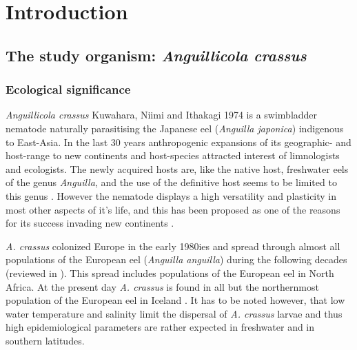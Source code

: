 

\chapter{Introduction}
\label{chap:intro}
\ifpdf
    \graphicspath{{1_introduction/figures/PNG/}{1_introduction/figures/PDF/}{1_introduction/figures/}}
\else
    \graphicspath{{1_introduction/figures/EPS/}{1_introduction/figures/}}
\fi


\section{The study organism: \textit{Anguillicola crassus}} 
\label{stud-org}

\subsection{Ecological significance} 
\label{eco-sig}

\textit{Anguillicola crassus} Kuwahara, Niimi and Ithakagi 1974
\cite{kuwahara_Niimi_Itagaki_1974} is a swimbladder nematode naturally
parasitising the Japanese eel (\textit{Anguilla japonica}) indigenous
to East-Asia. In the last 30 years anthropogenic expansions of its
geographic- and host-range to new continents and host-species
attracted interest of limnologists and ecologists. The newly acquired
hosts are, like the native host, freshwater eels of the genus
\textit{Anguilla}, and the use of the definitive host seems to be
limited to this genus \cite{sures_development_1999}. However the
nematode displays a high versatility and plasticity in most other
aspects of it's life, and this has been proposed as one of the reasons
for its success invading new continents
\cite{taraschewski_hosts_2007}.

\textit{A. crassus} colonized Europe in the early 1980ies and spread
through almost all populations of the European eel (\textit{Anguilla
  anguilla}) during the following decades (reviewed in
\cite{kirk_impact_2003}). This spread includes populations of the
European eel in North
Africa\cite{gargouri_ben_abdallah_spatio-temporal_2006,
  loukili_dynamics_2007}. At the present day \textit{A. crassus} is
found in all but the northernmost population of the European eel in
Iceland \cite{kristmundsson_parasite_2007}. It has to be noted
however, that low water temperature \cite{knopf_impact_1998} and
salinity \cite{kirk_effect_2000} limit the dispersal of
\textit{A. crassus} larvae and thus high epidemiological parameters are
rather expected in freshwater and in southern latitudes.

